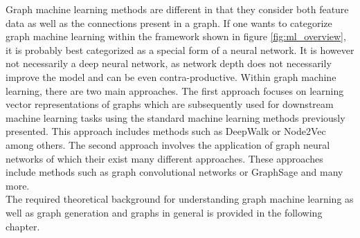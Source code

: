 	\noindent Graph machine learning methods are different in that they consider 
	both feature data as well as the connections present in a graph. If one wants 
	to categorize graph machine learning within the framework shown in figure 
	\ref{fig:ml_overview}, it is probably best categorized as a special form of 
	a neural network. It is however not necessarily a deep neural network, as 
	network depth does not necessarily improve the model and can be even 
	contra-productive. Within graph machine learning, there are two main
	approaches. The first approach focuses on learning vector representations
	of graphs which are subsequently used for downstream machine learning tasks
	using the standard machine learning methods previously presented. This
	approach includes methods such as DeepWalk \citep{perozzi2014deepwalk} or
	Node2Vec \citep{grover2016node2vec} among others. The second approach
	involves the application of graph neural networks of which their exist many
	different approaches. These approaches include methods such as graph
	convolutional networks \citep{kipf2016semi} or GraphSage
	\citep{hamilton2017inductive} and many more. \\

	\noindent The required theoretical background for understanding graph
	machine learning as well as graph generation and graphs in general is
	provided in the following chapter.
